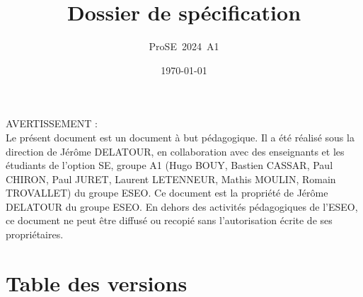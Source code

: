 \documentclass[a4paper,11pt,titlepage]{article}
\author{ProSE~2024~A1}        %
\title{Dossier de spécification}     %
\date{\normalsize\today}    %
\begin{document}
\maketitle

\BgThispage %
\vspace*{\fill}
\noindent
AVERTISSEMENT : \\
Le présent document est un document à but pédagogique.
Il a été réalisé sous la direction de Jérôme DELATOUR, en collaboration avec des enseignants et les étudiants de l'option SE, groupe A1 (Hugo BOUY, Bastien CASSAR, Paul CHIRON, Paul JURET, Laurent LETENNEUR, Mathis MOULIN, Romain TROVALLET) du groupe ESEO.
Ce document est la propriété de Jérôme DELATOUR du groupe ESEO. En dehors des activités pédagogiques de l'ESEO, ce document ne peut être diffusé ou recopié sans l'autorisation écrite de ses propriétaires.
\vspace*{\fill}
\clearpage

\section*{Table des versions}
 \label{TableOfVersion} %
\clearpage

\tableofcontents %












\newpage
\listoffigures \label{TableOfFigure} %

\end{document}
